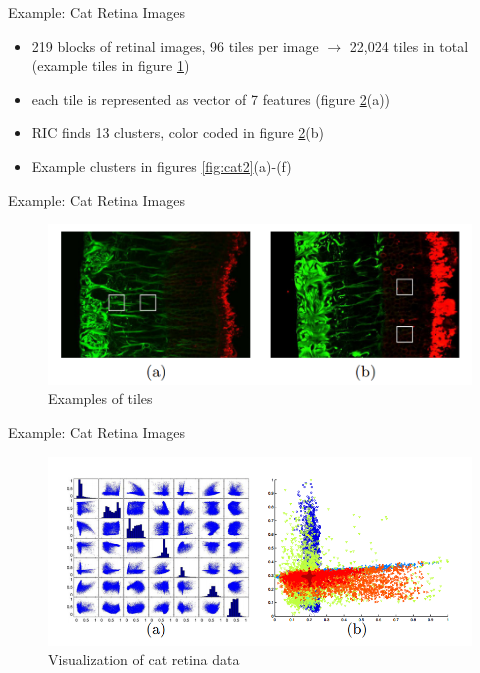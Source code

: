 \documentclass{beamer}
\begin{document}
  \begin{frame}{Example: Cat Retina Images}{}
    \begin{itemize}
      \item 219 blocks of retinal images, 96 tiles per image $\rightarrow$ 22,024 tiles in total (example tiles in figure \ref{fig:cat5})
      \item each tile is represented as vector of 7 features (figure \ref{fig:cat1}(a))
      \item RIC finds 13 clusters, color coded in figure \ref{fig:cat1}(b)
      \item Example clusters in figures \ref{fig:cat2}(a)-(f)
    \end{itemize}
  \end{frame}
  
  \note{}
  
  \begin{frame}{Example: Cat Retina Images}{}
    \begin{figure}
      \centering
      \includegraphics[width=\linewidth]{imgs/cat5}
      \caption[]{Examples of tiles\cite{Bohm2006-ts}}
      \label{fig:cat5}
    \end{figure}    
  \end{frame}
  
  \note{}
  
  \begin{frame}{Example: Cat Retina Images}{}
    \begin{figure}
      \centering
      \includegraphics[width=\linewidth]{imgs/cat1}
      \caption[]{Visualization of cat retina data\cite{Bohm2006-ts}}
      \label{fig:cat1}
    \end{figure}    
  \end{frame}
  
\end{document}
